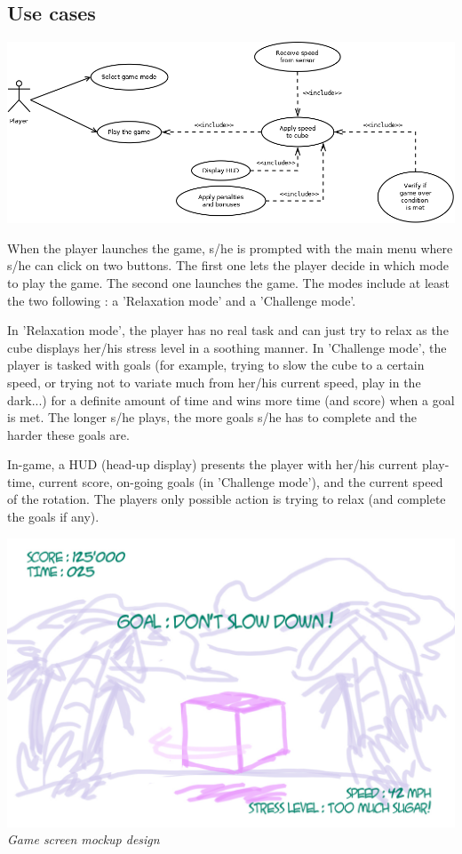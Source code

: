 \documentclass[12pt,a4paper]{article}
\begin{document}
\subsection{Use cases}

\includegraphics[width=\textwidth,height=\textheight,keepaspectratio]{graph/useCase.png}

When the player launches the game, s/he is prompted with the main menu where s/he can click on two buttons. The first one lets the player decide in which mode to play the game. The second one launches the game. The modes include at least the two following : a 'Relaxation mode' and a 'Challenge mode'. 

In 'Relaxation mode', the player has no real task and can just try to relax as the cube displays her/his stress level in a soothing manner. In 'Challenge mode', the player is tasked with goals (for example, trying to slow the cube to a certain speed, or trying not to variate much from her/his current speed, play in the dark...) for a definite amount of time and wins more time (and score) when a goal is met. The longer s/he plays, the more goals s/he has to complete and the harder these goals are.

In-game, a HUD (head-up display) presents the player with her/his current play-time, current score, on-going goals (in 'Challenge mode'), and the current speed of the rotation. The players only possible action is trying to relax (and complete the goals if any). 

\begin{center}
\includegraphics[width=\textwidth,height=\textheight,keepaspectratio]{graph/mockup1.jpg}
\textit{Game screen mockup design}
\end{center}
\end{document}
